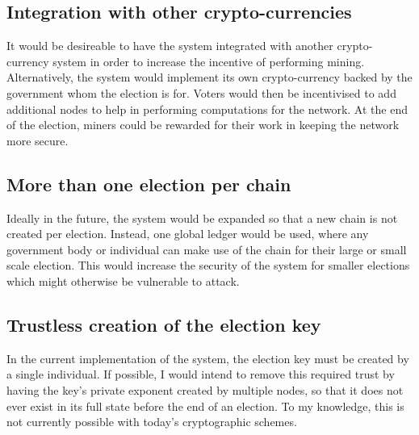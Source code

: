 \documentclass[a4paper,12pt]{article}
\begin{document}
\subsection{Integration with other crypto-currencies}
It would be desireable to have the system integrated with another crypto-currency system in order to increase the incentive of performing mining. Alternatively, the system would implement its own crypto-currency backed by the government whom the election is for. Voters would then be incentivised to add additional nodes to help in performing computations for the network. At the end of the election, miners could be rewarded for their work in keeping the network more secure.

\subsection{More than one election per chain}
Ideally in the future, the system would be expanded so that a new chain is not created per election. Instead, one global ledger would be used, where any government body or individual can make use of the chain for their large or small scale election. This would increase the security of the system for smaller elections which might otherwise be vulnerable to attack.

\subsection{Trustless creation of the election key}
In the current implementation of the system, the election key must be created by a single individual. If possible, I would intend to remove this required trust by having the key's private exponent created by multiple nodes, so that it does not ever exist in its full state before the end of an election. To my knowledge, this is not currently possible with today's cryptographic schemes.

\newpage
\end{document}
